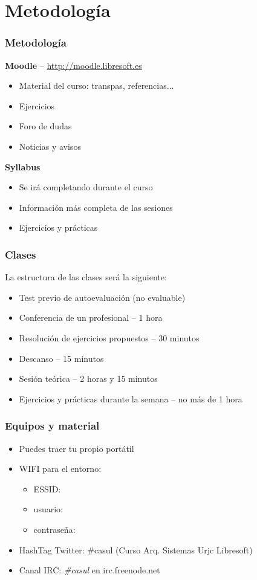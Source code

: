 \documentclass{beamer}
\begin{document}
\section{Metodología}
\begin{frame}
  \frametitle{Metodología}
  \begin{center}
    \textbf{Moodle} -- \url{http://moodle.libresoft.es}
  \end{center}
  \begin{itemize}
    \item Material del curso: transpas, referencias...
    \item Ejercicios
    \item Foro de dudas
    \item Noticias y avisos
  \end{itemize}
  \vspace{0.15cm}
  \begin{center}
    \textbf{Syllabus}\\
  \end{center}
  \begin{itemize}
    \item Se irá completando durante el curso
    \item Información más completa de las sesiones
    \item Ejercicios y prácticas
  \end{itemize}
\end{frame}

\begin{frame}
  \frametitle{Clases}
  La estructura de las clases será la siguiente:
  \begin{itemize}
    \item Test previo de autoevaluación (no evaluable)
    \item Conferencia de un profesional -- 1 hora
    \item Resolución de ejercicios propuestos -- 30 minutos
    \item Descanso -- 15 minutos
    \item Sesión teórica -- 2 horas y 15 minutos
    \item Ejercicios y prácticas durante la semana -- no más de 1 hora
  \end{itemize}
\end{frame}

\begin{frame}
  \frametitle{Equipos y material}
  \begin{itemize}
    \item Puedes traer tu propio portátil
    \item WIFI para el entorno:
      \begin{itemize}
        \item ESSID:   
        \item usuario: 
        \item contraseña: 
      \end{itemize}
    \item HashTag Twitter: \#casul (Curso Arq. Sistemas Urjc Libresoft)
    \item Canal IRC: \textit{\#casul} en irc.freenode.net
  \end{itemize}
\end{frame}
\end{document}

